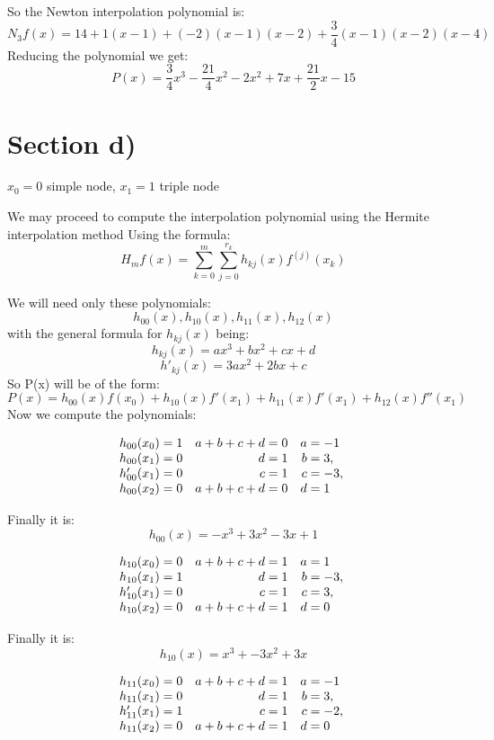 \documentclass{article}
\begin{document}
So the Newton interpolation polynomial is:
\[
    N_3f(x) = 14 + 1(x-1) + (-2)(x-1)(x-2) + \frac{3}{4}(x-1)(x-2)(x-4)
\]
Reducing the polynomial we get:
\[
    P(x) = \frac{3}{4}x^3 - \frac{21}{4}x^2 - 2x^2 + 7x + \frac{21}{2}x - 15
\]


\section*{Section d)}
\begin{center}
    \(x_0 = 0\) simple node, \(x_1 = 1\) triple node
\end{center}
We may proceed to compute the interpolation polynomial using the Hermite interpolation method
Using the formula:
\[
    H_mf(x) = \sum_{k=0}^{m} \sum_{j=0}^{r_k} h_{kj}(x)f^{(j)}(x_k)
\]

We will need only these polynomials:
\[
    h_{00}(x), h_{10}(x), h_{11}(x), h_{12}(x)
\]
with the general formula for \(h_{kj}(x)\) being:
\[
    h_{kj}(x) = ax^3 + bx^2 + cx + d
\]
\[
    h'_{kj}(x) = 3ax^2 + 2bx + c
\]
So P(x) will be of the form:
\[
    P(x) = h_{00}(x)f(x_0) + h_{10}(x)f'(x_1) + h_{11}(x)f'(x_1) + h_{12}(x)f''(x_1)
\]
Now we compute the polynomials:

\[
\begin{array}{r@{}l@{\quad}r@{}l@{\quad}r@{}l}
    h_{00}(x_0) &{}= 1 & a + b + c + d &{}= 0 & a &{}= -1\\
    h_{00}(x_1) &{}= 0 & d &{}= 1 & b &{}= 3,\  \\
    h'_{00}(x_1) &{}= 0 & c &{}= 1 & c &{}= -3,\ \\
    h_{00}(x_2) &{}= 0 & a + b + c + d &{}= 0 & d &{}= 1 \\
\end{array}
\]

Finally it is:
\[
    h_{00}(x) = -x^3 + 3x^2 - 3x + 1
\]

\[
\begin{array}{r@{}l@{\quad}r@{}l@{\quad}r@{}l}
    h_{10}(x_0) &{}= 0 & a + b + c + d &{}= 1 & a &{}= 1\\
    h_{10}(x_1) &{}= 1 & d &{}= 1 & b &{}= -3,\  \\
    h'_{10}(x_1) &{}= 0 & c &{}= 1 & c &{}= 3,\ \\
    h_{10}(x_2) &{}= 0 & a + b + c + d &{}= 1 & d &{}= 0 \\
\end{array}
\]

Finally it is:
\[
    h_{10}(x) = x^3 + -3x^2 + 3x
\]

\[
\begin{array}{r@{}l@{\quad}r@{}l@{\quad}r@{}l}
    h_{11}(x_0) &{}= 0 & a + b + c + d &{}= 1 & a &{}= -1\\
    h_{11}(x_1) &{}= 0 & d &{}= 1 & b &{}= 3,\  \\
    h'_{11}(x_1) &{}= 1 & c &{}= 1 & c &{}= -2,\ \\
    h_{11}(x_2) &{}= 0 & a + b + c + d &{}= 1 & d &{}= 0 \\
\end{array}
\]
\end{document}
